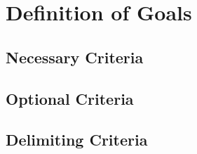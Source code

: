 \chapter{Definition of Goals}
\label{ch:goals}

\section{Necessary Criteria}

\section{Optional Criteria}

\section{Delimiting Criteria}